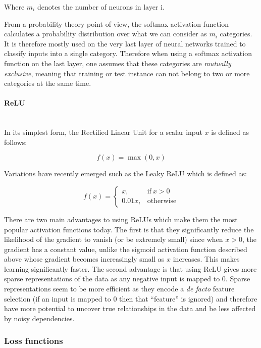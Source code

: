 \documentclass[12pt,twoside]{article}
\newcommand{\para}[1]{\paragraph{#1}\mbox{}\\}
\begin{document}
Where $m_i$ denotes the number of neurons in layer i.

From a probability theory point of view, the softmax activation function
calculates a probability distribution over what we can consider as $m_i$
categories. It is therefore mostly used on the very last layer of neural
networks trained to classify inputs into a single category. Therefore when
using a softmax activation function on the last layer, one assumes that these
categories are \textit{mutually exclusive}, meaning that training or test instance can
not belong to two or more categories at the same time.

\para{ReLU}\label{para:relu}
In its simplest form, the Rectified Linear Unit \cite{RefWorks:24} for a scalar input $x$ is defined as
follows:

\begin{equation}
  f(x) = \max(0,x)
  \label{eq:relu}
\end{equation}

Variations have recently emerged such as the Leaky ReLU \cite{RefWorks:25} which is defined
as:

\begin{equation}
  f(x) = 
  \begin{cases}
    x, & \text{if}\ x >0\\
    0.01x, & \text{otherwise}
  \end{cases}
  \label{eq:leaky_relu}
\end{equation}

There are two main advantages to using ReLUs which make them the most popular
activation functions today. The first is that they significantly reduce the
likelihood of the gradient to vanish (or be extremely small) since when
$x >0$, the gradient has a constant value, unlike the sigmoid activation
function described above whose gradient becomes increasingly small as
$x$ increases. This makes learning significantly faster. The second advantage
is that using ReLU gives more sparse representations of the data as any
negative input is mapped to $0$. Sparse representations seem to be more
efficient as they encode a \textit{de facto} feature selection (if an input is
mapped to 0 then that ``feature'' is ignored) and therefore
have more potential to uncover true relationships in the data and be less
affected by noisy dependencies.

\subsubsection{Loss functions}\label{sec:loss}
\end{document}
